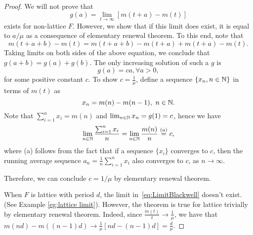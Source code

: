 \documentclass[a4paper,10pt,english]{article}
\begin{document}
\begin{proof} 
We will not prove that 
\begin{equation}
\label{eq:LimitBlackwell}
g(a) = \lim_{t \to \infty} [m(t+a) - m(t)]
\end{equation}exists for non-lattice $F$. However, we show that if this limit does exist, it is equal to $a/\mu$ as a consequence of elementary renewal theorem. To this end, note that
\begin{equation*}
m(t+a+b) - m(t) = m(t+a+b) - m(t+a) + m(t+a) - m(t).
\end{equation*}
Taking limits on both sides of the above equation, we conclude that $g(a+b) = g(a) +  g(b)$. The only increasing solution of such a $g$ is
\begin{equation*}
g(a) = ca, \forall a > 0,
\end{equation*}
for some positive constant $c$. To show $c = \frac{1}{\mu}$, define a sequence $\{x_n, n \in \mathbb{N}\}$ in terms of $m(t)$ as 
\begin{equation*}
x_n = m(n) - m(n-1),~n \in \mathbb{N}.
\end{equation*}
Note that $\sum_{i=1}^nx_i = m(n)$ and $\lim_{n \in \mathbb{N}}x_n = g(1) = c$, hence we have
\begin{equation*}
\lim_{n \in \mathbb{N}}\frac{\sum_{i=1}^nx_i}{n} = \lim_{n \in \mathbb{N}}\frac{m(n)}{n} \stackrel{(a)}{=} c,
\end{equation*}
where (a) follows from the fact that if a sequence $\{x_i\}$ converges to $c$, then the running average sequence $a_n = \frac{1}{n}\sum_{i=1}^n x_i$ also converges to $c$, as $n \to \infty.$

Therefore, we can conclude $c = 1/\mu$ by elementary renewal theorem.

When $F$ is lattice with period $d$, the limit in~\eqref{eq:LimitBlackwell} doesn't exist. (See Example \ref{eg:lattice limit}). However, the theorem is true for lattice trivially by elementary renewal theorem. Indeed, since $\frac{m(t)}{t} \to \frac{1}{\mu}$, we have that $m(nd)-m((n-1)d) \to \frac{1}{\mu}[nd-(n-1)d] = \frac{d}{\mu}.$
\end{proof}
\end{document}
